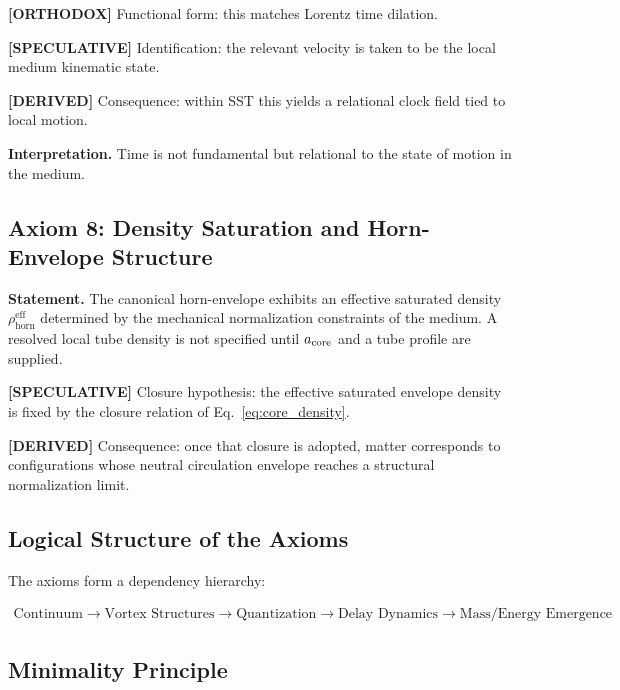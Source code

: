 \documentclass[11pt]{article}
\theoremstyle{definition}
\theoremstyle{plain}
\theoremstyle{remark}
\newcommand{\rhohorn}{\rho_{\mathrm{horn}}^{\mathrm{eff}}}
\begin{document}
        \textbf{[ORTHODOX]} Functional form: this matches Lorentz time dilation.

        \textbf{[SPECULATIVE]} Identification: the relevant velocity is taken to be the local medium kinematic state.

        \textbf{[DERIVED]} Consequence: within SST this yields a relational clock field tied to local motion.
        
        \textbf{Interpretation.}
        Time is not fundamental but relational to the state of motion in the medium.
    
    \subsection{Axiom 8: Density Saturation and Horn-Envelope Structure}
        
        \textbf{Statement.}
        The canonical horn-envelope exhibits an effective saturated density
        \(\rhohorn\) determined by the mechanical normalization constraints of the
        medium. A resolved local tube density is not specified until
        \(a_{\rm core}\) and a tube profile are supplied.
        
        \textbf{[SPECULATIVE]} Closure hypothesis: the effective saturated
        envelope density is fixed by the closure relation of Eq.~\eqref{eq:core_density}.

        \textbf{[DERIVED]} Consequence: once that closure is adopted, matter
        corresponds to configurations whose neutral circulation envelope reaches
        a structural normalization limit.
    
    \subsection{Logical Structure of the Axioms}
        
        The axioms form a dependency hierarchy:
        
        \begin{align}
            \text{Continuum}
            \rightarrow \text{Vortex Structures}
            \rightarrow \text{Quantization}
            \rightarrow \text{Delay Dynamics}
            \rightarrow \text{Mass/Energy Emergence}
        \end{align}
    
    \subsection{Minimality Principle}
        
\end{document}
